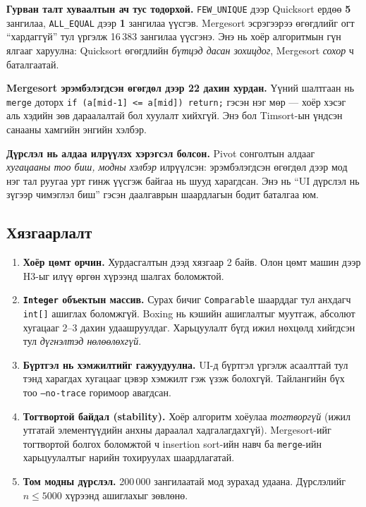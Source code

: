 \documentclass[11pt,a4paper]{article}
\begin{document}
\textbf{Гурван талт хуваалтын ач тус тодорхой.} \texttt{FEW\_UNIQUE} дээр
Quicksort ердөө \textbf{5} зангилаа, \texttt{ALL\_EQUAL} дээр \textbf{1}
зангилаа үүсгэв. Mergesort эсрэгээрээ өгөгдлийг огт ``хардаггүй'' тул үргэлж
16\,383 зангилаа үүсгэнэ. Энэ нь хоёр алгоритмын гүн ялгааг харуулна:
Quicksort өгөгдлийн \emph{бүтцэд дасан зохицдог}, Mergesort \emph{сохор} ч
баталгаатай.

\textbf{Mergesort эрэмбэлэгдсэн өгөгдөл дээр 22 дахин хурдан.} Үүний
шалтгаан нь \texttt{merge} доторх \texttt{if (a[mid-1] <= a[mid]) return;}
гэсэн нэг мөр --- хоёр хэсэг аль хэдийн зөв дараалалтай бол хуулалт хийхгүй.
Энэ бол Timsort-ын үндсэн санааны хамгийн энгийн хэлбэр.

\textbf{Дүрслэл нь алдаа илрүүлэх хэрэгсэл болсон.} Pivot сонголтын алдааг
\emph{хугацааны тоо биш, модны хэлбэр} илрүүлсэн: эрэмбэлэгдсэн өгөгдөл дээр
мод нэг тал руугаа урт гинж үүсгэж байгаа нь шууд харагдсан. Энэ нь ``UI
дүрслэл нь зүгээр чимэглэл биш'' гэсэн даалгаврын шаардлагын бодит
баталгаа юм.

\subsection{Хязгаарлалт}
\begin{enumerate}[nosep,leftmargin=*]
  \item \textbf{Хоёр цөмт орчин.} Хурдасгалтын дээд хязгаар 2 байв. Олон
        цөмт машин дээр H3-ыг илүү өргөн хүрээнд шалгах боломжтой.
  \item \textbf{\texttt{Integer} объектын массив.} Сурах бичиг
        \texttt{Comparable} шаарддаг тул анхдагч \texttt{int[]} ашиглах
        боломжгүй. Boxing нь кэшийн ашиглалтыг муутгаж, абсолют хугацааг
        2--3 дахин удаашруулдаг. Харьцуулалт бүгд ижил нөхцөлд хийгдсэн тул
        \emph{дүгнэлтэд нөлөөлөхгүй}.
  \item \textbf{Бүртгэл нь хэмжилтийг гажуудуулна.} UI-д бүртгэл үргэлж
        асаалттай тул тэнд харагдах хугацааг цэвэр хэмжилт гэж үзэж болохгүй.
        Тайлангийн бүх тоо \texttt{--no-trace} горимоор авагдсан.
  \item \textbf{Тогтвортой байдал (stability).} Хоёр алгоритм хоёулаа
        \emph{тогтворгүй} (ижил утгатай элементүүдийн анхны дараалал
        хадгалагдахгүй). Mergesort-ийг тогтвортой болгох боломжтой ч
        insertion sort-ийн навч ба \texttt{merge}-ийн харьцуулалтыг нарийн
        тохируулах шаардлагатай.
  \item \textbf{Том модны дүрслэл.} 200\,000 зангилаатай мод зурахад удаана.
        Дүрслэлийг $n \le 5000$ хүрээнд ашиглахыг зөвлөнө.
\end{enumerate}
\end{document}
